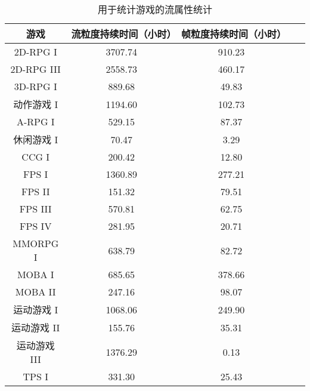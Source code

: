 \begin{table}[ht]
\centering
\caption{用于统计游戏的流属性统计}
\begin{tabular}{@{}ccccc@{}}
\toprule
\textbf{游戏}        & \textbf{流粒度持续时间（小时）} & \textbf{帧粒度持续时间（小时）} \\ \midrule
2D-RPG I             & 3707.74                  & 910.23                    \\
2D-RPG III           & 2558.73                  & 460.17                    \\
3D-RPG I             & 889.68                   & 49.83                     \\
动作游戏 I           & 1194.60                  & 102.73                    \\
A-RPG I              & 529.15                   & 87.37                     \\
休闲游戏 I           & 70.47                    & 3.29                      \\
CCG I                & 200.42                   & 12.80                     \\
FPS I                & 1360.89                  & 277.21                    \\
FPS II               & 151.32                   & 79.51                     \\
FPS III              & 570.81                   & 62.75                     \\
FPS IV               & 281.95                   & 20.71                     \\
MMORPG I             & 638.79                   & 82.72                     \\
MOBA I               & 685.65                   & 378.66                    \\
MOBA II              & 247.16                   & 98.07                     \\
运动游戏 I           & 1068.06                  & 249.90                    \\
运动游戏 II          & 155.76                   & 35.31                     \\
运动游戏 III         & 1376.29                  & 0.13                      \\
TPS I                & 331.30                   & 25.43                     \\ \bottomrule
\end{tabular}
\label{table_flow_count}
\end{table}
